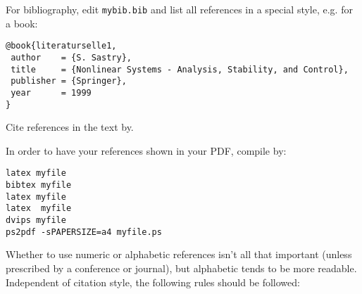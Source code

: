 \documentclass[a4paper,twoside, openright,12pt]{report}
\begin{document}
For bibliography, edit {\tt mybib.bib} and list all
references in a special style, e.g. for a book: 
\begin{verbatim}
@book{literaturselle1,
 author    = {S. Sastry},
 title     = {Nonlinear Systems - Analysis, Stability, and Control},
 publisher = {Springer},
 year      = 1999
}
\end{verbatim}

Cite references in the text by.

In order to have your references shown in your PDF, compile by:

\begin{verbatim} 
latex myfile
bibtex myfile
latex myfile
latex  myfile
dvips myfile
ps2pdf -sPAPERSIZE=a4 myfile.ps
\end{verbatim}

Whether to use numeric or alphabetic references isn't all that important (unless prescribed by a conference or journal), but alphabetic tends to be more readable. Independent of citation style, the following rules should be followed:
\end{document}
